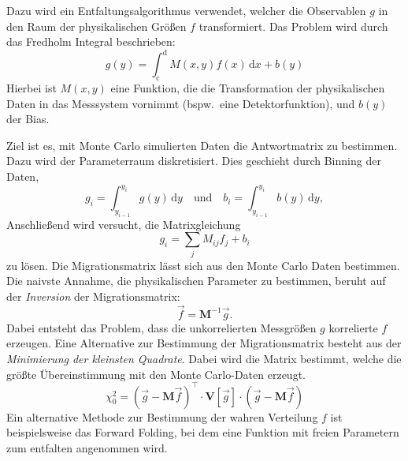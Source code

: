 
Dazu wird ein
Entfaltungsalgorithmus verwendet,
welcher die Observablen $g$
in den Raum der physikalischen Größen $f$ transformiert.
Das Problem wird durch das Fredholm Integral beschrieben:
\begin{equation}
	g(y) = \int_\text{c}^\text{d} M(x,y) f(x) \, \text{d}x + b(y)
\end{equation}
Hierbei ist $M(x, y)$ eine Funktion, die die Transformation der physikalischen
Daten in das Messsystem vornimmt (bspw.\ eine Detektorfunktion), und $b(y)$ der Bias.

Ziel ist es, mit Monte Carlo simulierten Daten
die Antwortmatrix zu bestimmen.
Dazu wird der Parameterraum diskretisiert.
Dies geschieht durch Binning der Daten,
\begin{equation}
	g_i = \int_{y_{i-1}}^{y_i} g(y) \, \text{d}y \quad \text{und} \quad
	b_i = \int_{y_{i-1}}^{y_i} b(y) \, \text{d}y,
\end{equation}
Anschließend wird versucht, die Matrixgleichung
\begin{equation}
	g_i = \sum_j M_{ij} f_j + b_i
\end{equation}
zu lösen.
Die Migrationsmatrix lässt sich aus den Monte Carlo Daten
bestimmen.
Die naivste Annahme, die physikalischen Parameter zu bestimmen,
beruht auf der \textit{Inversion} der Migrationsmatrix:
\begin{equation}
    \vec{f} = \mathbf{M}^{-1} \vec{g}.
\end{equation}
Dabei entsteht das Problem, dass die unkorrelierten Messgrößen $g$
korrelierte $f$ erzeugen.
Eine Alternative zur Bestimmung der Migrationsmatrix
besteht aus der \textit{Minimierung der kleinsten Quadrate}.
Dabei wird die Matrix bestimmt,
welche die größte Übereinstimmung mit den Monte Carlo-Daten erzeugt.
\begin{equation}
    \chi^2_0 = {\left( \vec{g} - \mathbf{M} \vec{f} \right)}^\intercal
        \cdot \mathbf{V} \left[ \vec{g} \right] \cdot
        \left( \vec{g} - \mathbf{M} \vec{f} \right)
\end{equation}
Ein alternative Methode zur Bestimmung der wahren Verteilung $f$ ist
beispielsweise das Forward Folding, 
bei dem eine Funktion mit freien Parametern zum entfalten angenommen wird.


